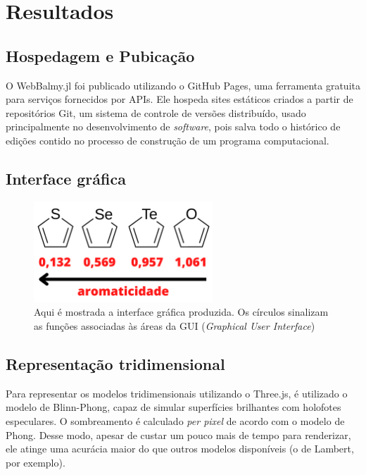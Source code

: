 \chapter{Resultados}
\section{Hospedagem e Pubicação}

O WebBalmy.jl foi publicado utilizando o GitHub Pages, uma ferramenta gratuita para serviços fornecidos por APIs. Ele hospeda sites estáticos criados a partir de repositórios Git, um sistema de controle de versões distribuído, usado principalmente no desenvolvimento de \textit{software}, pois salva todo o histórico de edições contido no processo de construção de um programa computacional. 

\section{Interface gráfica}

\begin{figure}[htb]
	\caption{\label{gui-pronta} Aqui é mostrada a interface gráfica produzida. Os círculos sinalizam as funções associadas às áreas da GUI (\textit{Graphical User Interface})}
	\begin{center}
		\includegraphics[width=0.6\textwidth]{images/aromaticity.png}
	\end{center}
\end{figure}

\section{Representação tridimensional}
Para representar os modelos tridimensionais utilizando o Three.js, é utilizado o modelo de Blinn-Phong, capaz de simular superfícies brilhantes com holofotes especulares. O sombreamento é calculado \textit{per pixel} de acordo com o modelo de Phong. Desse modo, apesar de custar um pouco mais de tempo para renderizar, ele atinge uma acurácia maior do que outros modelos disponíveis (o de Lambert, por exemplo).

